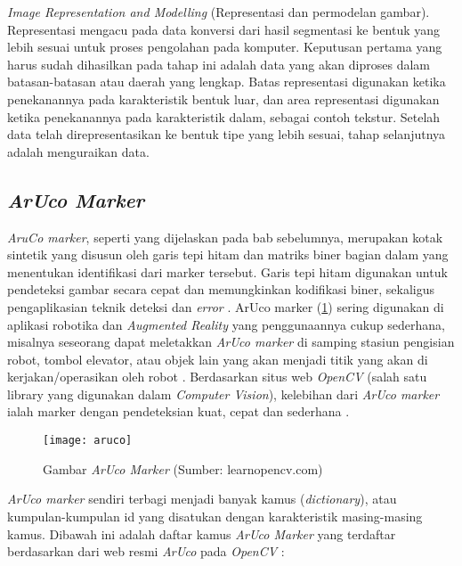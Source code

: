 \begin{packed_enum}
	\item \textit{Image Representation and Modelling} (Representasi dan permodelan gambar).
	\\	Representasi mengacu pada data konversi dari hasil segmentasi ke bentuk yang lebih sesuai untuk proses pengolahan pada komputer. Keputusan pertama yang harus sudah dihasilkan pada tahap ini adalah data yang akan diproses dalam batasan-batasan atau daerah yang lengkap. Batas representasi digunakan ketika penekanannya pada karakteristik bentuk luar, dan area representasi digunakan ketika penekanannya pada karakteristik dalam, sebagai contoh tekstur. Setelah data telah direpresentasikan ke bentuk tipe yang lebih sesuai, tahap selanjutnya adalah menguraikan data.
\end{packed_enum}

\subsection{\textit{ArUco Marker}}
\textit{AruCo marker}, seperti yang dijelaskan pada bab sebelumnya, merupakan kotak sintetik yang disusun oleh garis tepi hitam dan matriks biner bagian dalam yang menentukan identifikasi dari marker tersebut. Garis tepi hitam digunakan untuk pendeteksi gambar secara cepat dan memungkinkan kodifikasi biner, sekaligus pengaplikasian teknik deteksi dan \textit{error} \citep{priambodo2022vision}.
ArUco marker (\cref{fig:aruco}) sering digunakan di aplikasi robotika dan \textit{Augmented Reality} yang penggunaannya cukup sederhana, misalnya seseorang dapat meletakkan \textit{ArUco marker} di samping stasiun pengisian robot, tombol elevator, atau objek lain yang akan menjadi titik yang akan di kerjakan/operasikan oleh robot \citep{stemR}. Berdasarkan situs web \textit{OpenCV} (salah satu library yang digunakan dalam \textit{Computer Vision}), kelebihan dari \textit{ArUco marker} ialah marker dengan pendeteksian kuat, cepat dan sederhana \citep{detectaruco}.

\begin{figure}[H]
	\centering
	\texttt{[image: aruco]}
	\caption{Gambar \textit{ArUco Marker} (Sumber: learnopencv.com)}
	\label{fig:aruco}
\end{figure}

\textit{ArUco marker} sendiri terbagi menjadi banyak kamus (\textit{dictionary}), atau kumpulan-kumpulan id yang disatukan dengan karakteristik masing-masing kamus. Dibawah ini adalah daftar kamus \textit{ArUco Marker} yang terdaftar berdasarkan dari web resmi \textit{ArUco} pada \textit{OpenCV} \citep{opencvscv}:

